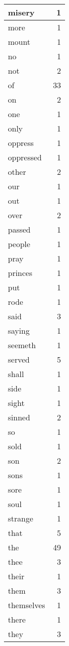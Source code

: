 \begin{center}
\begin{longtable}{l|r}
misery & 1\\ \hline 
more & 1\\ \hline 
mount & 1\\ \hline 
no & 1\\ \hline 
not & 2\\ \hline 
of & 33\\ \hline 
on & 2\\ \hline 
one & 1\\ \hline 
only & 1\\ \hline 
oppress & 1\\ \hline 
oppressed & 1\\ \hline 
other & 2\\ \hline 
our & 1\\ \hline 
out & 1\\ \hline 
over & 2\\ \hline 
passed & 1\\ \hline 
people & 1\\ \hline 
pray & 1\\ \hline 
princes & 1\\ \hline 
put & 1\\ \hline 
rode & 1\\ \hline 
said & 3\\ \hline 
saying & 1\\ \hline 
seemeth & 1\\ \hline 
served & 5\\ \hline 
shall & 1\\ \hline 
side & 1\\ \hline 
sight & 1\\ \hline 
sinned & 2\\ \hline 
so & 1\\ \hline 
sold & 1\\ \hline 
son & 2\\ \hline 
sons & 1\\ \hline 
sore & 1\\ \hline 
soul & 1\\ \hline 
strange & 1\\ \hline 
that & 5\\ \hline 
the & 49\\ \hline 
thee & 3\\ \hline 
their & 1\\ \hline 
them & 3\\ \hline 
themselves & 1\\ \hline 
there & 1\\ \hline 
they & 3\\ \hline 

\end{longtable}
\end{center}
